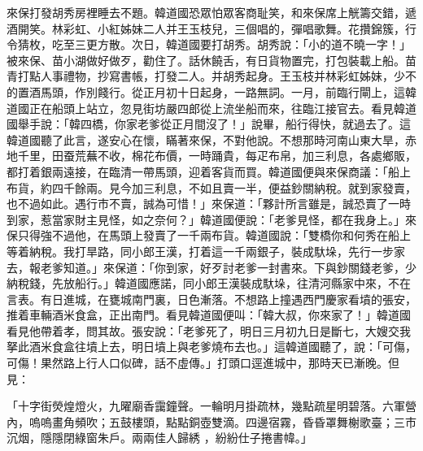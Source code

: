 來保打發胡秀房裡睡去不題。韓道國恐眾怕眾客商耻笑，和來保席上觥籌交錯，遞酒開笑。林彩虹、小紅姊妹二人并王玉枝兒，三個唱的，彈唱歌舞。花攢錦簇，行令猜枚，吃至三更方散。次日，韓道國要打胡秀。胡秀說：「小的道不曉一字！」被來保、苗小湖做好做歹，勸住了。話休饒舌，有日貨物置完，打包裝載上船。苗青打點人事禮物，抄寫書帳，打發二人。并胡秀起身。王玉枝并林彩虹姊妹，少不的置酒馬頭，作別餞行。從正月初十日起身，一路無詞。一月，前臨行閘上，這韓道國正在船頭上站立，忽見街坊嚴四郎從上流坐船而來，往臨江接官去。看見韓道國舉手說：「韓四橋，你家老爹從正月間沒了！」說畢，船行得快，就過去了。這韓道國聽了此言，遂安心在懷，瞞著來保，不對他說。不想那時河南山東大旱，赤地千里，田蚕荒蕪不收，棉花布價，一時踊貴，每疋布帛，加三利息，各處鄉販，都打着銀兩遠接，在臨清一帶馬頭，迎着客貨而買。韓道國便與來保商議：「船上布貨，約四千餘兩。見今加三利息，不如且賣一半，便益鈔關納稅。就到家發賣，也不過如此。遇行市不賣，誠為可惜！」來保道：「夥計所言雖是，誠恐賣了一時到家，惹當家財主見怪，如之奈何？」韓道國便說：「老爹見怪，都在我身上。」來保只得強不過他，在馬頭上發賣了一千兩布貨。韓道國說：「雙橋你和何秀在船上等着納稅。我打旱路，同小郎王漢，打着這一千兩銀子，裝成馱垛，先行一步家去，報老爹知道。」來保道：「你到家，好歹討老爹一封書來。下與鈔關錢老爹，少納稅錢，先放船行。」韓道國應諾，同小郎王漢裝成馱垛，往清河縣家中來，不在言表。有日進城，在甕城南門裏，日色漸落。不想路上撞遇西門慶家看墳的張安，推着車輛酒米食盒，正出南門。看見韓道國便叫：「韓大叔，你來家了！」韓道國看見他帶着孝，問其故。張安說：「老爹死了，明日三月初九日是斷七，大嫂交我拏此酒米食盒往墳上去，明日墳上與老爹燒布去也。」這韓道國聽了，說：「可傷，可傷！果然路上行人口似碑，話不虛傳。」打頭口逕進城中，那時天已漸晚。但見：

「十字街熒煌燈火，九曜廟香靄鐘聲。一輪明月掛疏林，幾點疏星明碧落。六軍營內，嗚嗚畫角頻吹；五鼓樓頭，點點銅壺雙滴。四邊宿霧，昏昏罩舞榭歌臺；三市沉烟，隱隱閉綠窗朱戶。兩兩佳人歸綉 ，紛紛仕子捲書幃。」

